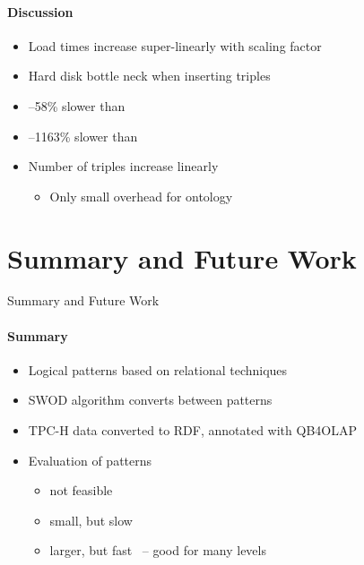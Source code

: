 \begin{frame}{\eval}
\framesubtitle{Discussion}
\begin{itemize}
    \item Load times increase super-linearly with scaling factor
    \item Hard disk bottle neck when inserting triples
    \item {}--58\% slower than \snowpat
    \item {}--1163\% slower than \snowpat
    \item Number of triples increase linearly
    \begin{itemize}
        \item Only small overhead for ontology
    \end{itemize}
\end{itemize}
\end{frame}


\newcommand{\conc}{Summary and Future Work}
\section{\conc}
\begin{frame}{\conc}
\framesubtitle{Summary}
\begin{itemize}
    \item<+-> Logical patterns based on relational techniques
    \item<+-> SWOD algorithm converts between patterns
    \item<+-> TPC-H data converted to RDF, annotated with QB4OLAP
    \item<+-> Evaluation of patterns
    \begin{itemize}
        \item<1-3,+-> \denormpat not feasible
        \item<1-3,+-> \snowpat small, but slow \qet
        \item<1-3,+-> \starpat larger, but fast \qet\ -- good for many levels
    \end{itemize}
\end{itemize}
\end{frame}

